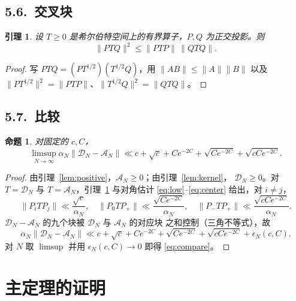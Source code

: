 \documentclass[12pt,a4paper]{amsart}
\numberwithin{equation}{section}
\theoremstyle{plain}
\newtheorem{proposition}[theorem]{命题}
\newtheorem{lemma}[theorem]{引理}
\theoremstyle{definition}
\begin{document}
\subsection*{5.6.\ 交叉块}

\begin{lemma}\label{lem:cross}
设 $T\ge0$ 是希尔伯特空间上的有界算子，$P,Q$ 为正交投影。则
\begin{equation}\label{eq:cross}
 \|PTQ\|^2\le\|PTP\|\,\|QTQ\| .
\end{equation}
\end{lemma}

\begin{proof}
写 $PTQ=(P T^{1/2})(T^{1/2}Q)$，用 $\|AB\|\le\|A\|\|B\|$ 以及
$\|PT^{1/2}\|^2=\|PTP\|$、$\|T^{1/2}Q\|^2=\|QTQ\|$。
\end{proof}

\subsection*{5.7.\ 比较}

\begin{proposition}\label{prop:compare}
对固定的 $c,C$，
\begin{equation}\label{eq:compare}
 \limsup_{N\to\infty}\alpha_N\|\mathcal D_N-\mathscr A_N\|
 \ll c+\sqrt c+Ce^{-2C}+\sqrt{Ce^{-2C}}+\sqrt{cCe^{-2C}} .
\end{equation}
\end{proposition}

\begin{proof}
由引理~\ref{lem:positive}，$\mathscr A_N\ge0$；由引理~\ref{lem:kernel}，
$\mathcal D_N\ge0$。对 $T=\mathcal D_N$ 与 $T=\mathscr A_N$，引理~\ref{lem:cross}
与对角估计 \eqref{eq:low}--\eqref{eq:center} 给出，对 $i\ne j$，
\[
 \|P_iTP_j\|\ll\frac{\sqrt{c}}{\alpha_N},\quad
 \|P_0TP_+\|\ll\frac{\sqrt{Ce^{-2C}}}{\alpha_N},\quad
 \|P_-TP_+\|\ll\frac{\sqrt{cCe^{-2C}}}{\alpha_N} .
\]
$\mathcal D_N-\mathscr A_N$ 的九个块被 $\mathcal D_N$ 与 $\mathscr A_N$ 的对应块
之和控制（三角不等式），故
\[
 \alpha_N\|\mathcal D_N-\mathscr A_N\|
 \ll c+\sqrt c+Ce^{-2C}+\sqrt{Ce^{-2C}}+\sqrt{cCe^{-2C}}+\epsilon_N(c,C).
\]
对 $N$ 取 $\limsup$ 并用 $\epsilon_N(c,C)\to0$ 即得 \eqref{eq:compare}。
\end{proof}

\section{主定理的证明}\label{sec:proof}
\end{document}
